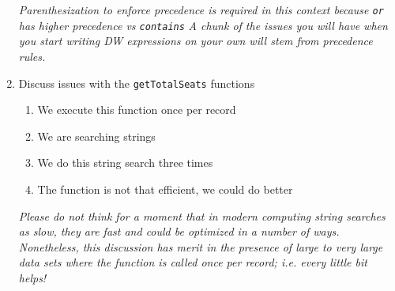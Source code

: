 \begin{enumerate}[resume*]
\begin{lstlisting}
  \end{lstlisting}
  \emph{
    Parenthesization to enforce precedence is required in this context because \texttt{or} has higher precedence vs \texttt{contains}
  }
  \emph{
    A chunk of the issues you will have when you start writing DW expressions on your own will stem from precedence rules.
  }
\item Discuss issues with the \texttt{getTotalSeats} functions
  \begin{enumerate}
  \item We execute this function once per record
  \item We are searching strings
  \item We do this string search three times
  \item The function is not that efficient, we could do better
  \end{enumerate}
  \emph{
    Please do not think for a moment that in modern computing string searches as slow, they are fast and could
    be optimized in a number of ways.  Nonetheless, this discussion has merit in the presence of large to very
    large data sets where the function is called once per record; i.e. every little bit helps!
  }
\end{enumerate}

